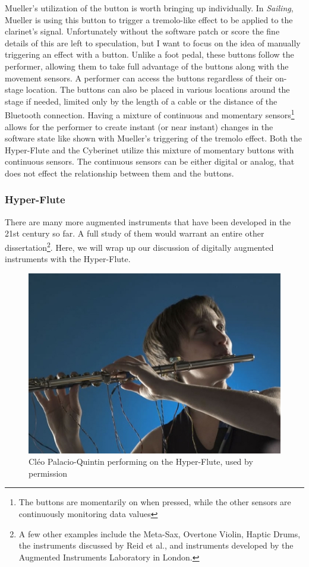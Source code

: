 Mueller's utilization of the button is worth bringing up individually. In \textit{Sailing}, Mueller is using this button to trigger a tremolo-like effect to be applied to the clarinet's signal. Unfortunately without the software patch or score the fine details of this are left to speculation, but I want to focus on the idea of manually triggering an effect with a button. Unlike a foot pedal, these buttons follow the performer, allowing them to take full advantage of the buttons along with the movement sensors. A performer can access the buttons regardless of their on-stage location. The buttons can also be placed in various locations around the stage if needed, limited only by the length of a cable or the distance of the Bluetooth connection. Having a mixture of continuous and momentary sensors\footnote{The buttons are momentarily on when pressed, while the other sensors are continuously monitoring data values} allows for the performer to create instant (or near instant) changes in the software state like shown with Mueller's triggering of the tremolo effect. Both the Hyper-Flute and the Cyberinet utilize this mixture of momentary buttons with continuous sensors. The continuous sensors can be either digital or analog, that does not effect the relationship between them and the buttons.


\subsubsection{Hyper-Flute}

There are many more augmented instruments that have been developed in the 21st century so far. A full study of them would warrant an entire other dissertation\footnote{A few other examples include the Meta-Sax, Overtone Violin, Haptic Drums, the instruments discussed by Reid et al.\cite{reid2018}, and instruments developed by the Augmented Instruments Laboratory in London.}. Here, we will wrap up our discussion of digitally augmented instruments with the Hyper-Flute.

\begin{figure}
    \centering
    \includegraphics[scale=0.5]{diagrams/palacio_quintin_cleo.jpg}
    \caption{Cléo Palacio-Quintin performing on the Hyper-Flute, used by permission} %
    \label{fig:hyper-flute}
\end{figure}

